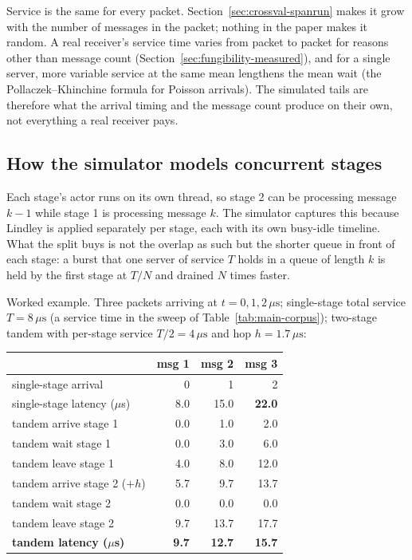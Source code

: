 \documentclass[11pt]{article}
\begin{document}
Service is the same for every packet. Section~\ref{sec:crossval-spanrun} makes it grow
with the number of messages in the packet; nothing in the paper makes it random. A real
receiver's service time varies from packet to packet for reasons other than message
count (Section~\ref{sec:fungibility-measured}), and for a single server, more variable
service at the same mean lengthens the mean wait (the Pollaczek--Khinchine formula for
Poisson arrivals). The simulated tails are therefore what the arrival timing and the
message count produce on their own, not everything a real receiver pays.

\subsection{How the simulator models concurrent stages}
\label{sec:sim-pipeline}

Each stage's actor runs on its own thread, so stage 2 can be processing message $k-1$
while stage 1 is processing message $k$. The simulator captures this because Lindley is
applied separately per stage, each with its own busy-idle timeline. What the split buys
is not the overlap as such but the shorter queue in front of each stage: a burst that one
server of service $T$ holds in a queue of length $k$ is held by the first stage at $T/N$
and drained $N$ times faster.

Worked example. Three packets arriving at $t = 0, 1, 2\,\mu\mathrm{s}$; single-stage total
service $T = 8\,\mu\mathrm{s}$ (a service time in the sweep of
Table~\ref{tab:main-corpus}); two-stage tandem with per-stage service $T/2 =
4\,\mu\mathrm{s}$ and hop $h = 1.7\,\mu\mathrm{s}$:

\begin{center}
\begin{tabular}{lrrr}
\toprule
 & msg 1 & msg 2 & msg 3 \\
\midrule
single-stage arrival & 0 & 1 & 2 \\
single-stage latency ($\mu$s) & 8.0 & 15.0 & \textbf{22.0} \\
\midrule
tandem arrive stage 1 & 0.0 & 1.0 & 2.0 \\
tandem wait stage 1 & 0.0 & 3.0 & 6.0 \\
tandem leave stage 1 & 4.0 & 8.0 & 12.0 \\
tandem arrive stage 2 ($+h$) & 5.7 & 9.7 & 13.7 \\
tandem wait stage 2 & 0.0 & 0.0 & 0.0 \\
tandem leave stage 2 & 9.7 & 13.7 & 17.7 \\
\textbf{tandem latency ($\mu$s)} & \textbf{9.7} & \textbf{12.7} & \textbf{15.7} \\
\bottomrule
\end{tabular}
\end{center}
\end{document}
